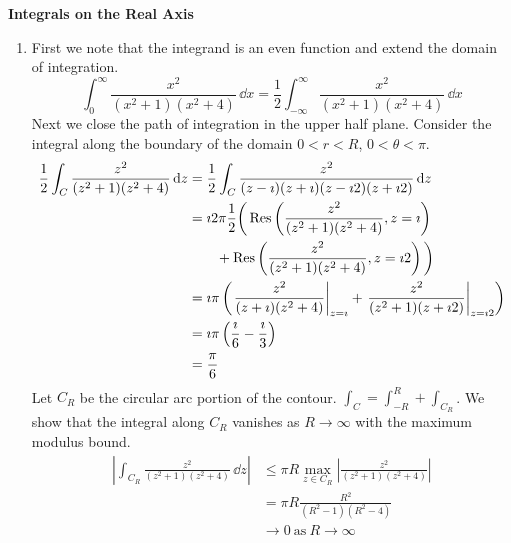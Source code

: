 {%
\begin{large}
  \noindent
  \textbf{Integrals on the Real Axis}
\end{large}




\begin{Solution}
  \label{solution integrate x2 x2+1 x2+4}
  \begin{enumerate}
  \item 
    First we note that the integrand is an even function and extend the 
    domain of integration.
    \[
    \int_0^\infty \frac{x^2}{(x^2 + 1) (x^2 + 4)}\,\dd x
    = \frac{1}{2} \int_{-\infty}^\infty \frac{x^2}{(x^2 + 1) (x^2 + 4)}\,\dd x
    \]
    Next we close the path of integration in the upper half plane.
    Consider the integral along the boundary of the domain $0 < r < R$,
    $0 < \theta < \pi$.  
    \begin{align*}
      \frac{1}{2} \int_C \frac{z^2}{(z^2 + 1) (z^2 + 4)}\,\mathrm{d} z
      &= \frac{1}{2} \int_C \frac{z^2}{(z - \imath) (z + \imath) (z - \imath 2) (z + \imath 2)}\,\mathrm{d} z
      \\
      &= \imath 2 \pi \frac{1}{2} \bigg( 
      \mathop{\mathrm{Res}}\nolimits\left( \frac{z^2}{(z^2 + 1) (z^2 + 4)}, z = \imath \right)
      \\
      &\qquad + \mathop{\mathrm{Res}}\nolimits\left( \frac{z^2}{(z^2 + 1) (z^2 + 4)}, z = \imath 2 \right)
      \bigg)
      \\
      &= \imath \pi \left( 
        \left. \frac{z^2}{(z + \imath) (z^2 + 4)} \right|_{z = \imath}
        + \left. \frac{z^2}{(z^2 + 1) (z + \imath 2)} \right|_{z = \imath 2}
      \right)
      \\
      &= \imath \pi \left( \frac{\imath}{6} - \frac{\imath}{3} \right)
      \\
      &= \frac{\pi}{6}
    \end{align*}
    Let $C_R$ be the circular arc portion of the contour. $\int_C = \int_{-R}^R + \int_{C_R}$.
    We show that the integral along $C_R$ vanishes as $R \to \infty$ with the 
    maximum modulus bound.
    \begin{align*}
      \left| \int_{C_R} \frac{z^2}{(z^2 + 1) (z^2 + 4)}\,\dd z \right|
      &\leq \pi R \max_{z \in C_R} \left| \frac{z^2}{(z^2 + 1) (z^2 + 4)} \right|
      \\
      &= \pi R \frac{R^2}{(R^2 - 1) (R^2 - 4)}
      \\
      &\to 0\ \mathrm{as}\ R \to \infty
    \end{align*}

\end{enumerate}
\end{Solution}}
